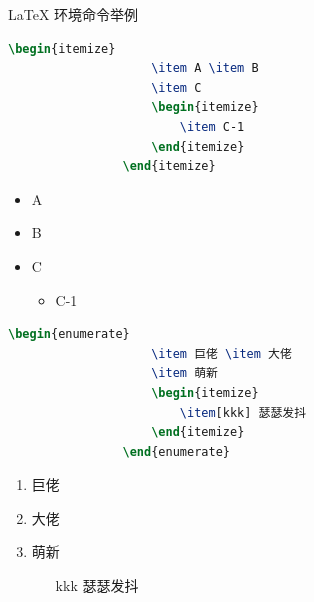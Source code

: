 \documentclass{beamer}
\begin{document}
	\begin{frame}[fragile]{\LaTeX{} 环境命令举例}
		\begin{minipage}{0.5\linewidth}
			\begin{lstlisting}[language=TeX]
				\begin{itemize}
					\item A \item B
					\item C
					\begin{itemize}
						\item C-1
					\end{itemize}
				\end{itemize}
			\end{lstlisting}
		\end{minipage}\hspace{1cm}
		\begin{minipage}{0.3\linewidth}
			\begin{itemize}
				\item A
				\item B
				\item C
				\begin{itemize}
					\item C-1
				\end{itemize}
			\end{itemize}
		\end{minipage}
		\medskip
		\pause
		\begin{minipage}{0.5\linewidth}
			\begin{lstlisting}[language=TeX]
				\begin{enumerate}
					\item 巨佬 \item 大佬
					\item 萌新
					\begin{itemize}
						\item[kkk] 瑟瑟发抖
					\end{itemize}
				\end{enumerate}
			\end{lstlisting}
		\end{minipage}\hspace{1cm}
		\begin{minipage}{0.3\linewidth}
			\begin{enumerate}
				\item 巨佬
				\item 大佬
				\item 萌新
				\begin{itemize}
					\item[kkk] 瑟瑟发抖
				\end{itemize}
			\end{enumerate}
		\end{minipage}
	\end{frame}
	
\end{document}
